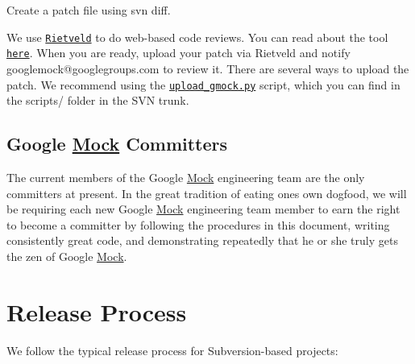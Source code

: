 \begin{DoxyEnumerate}
\item Create a patch file using {\ttfamily svn diff}.
\end{DoxyEnumerate}
\begin{DoxyEnumerate}
\item We use \href{http://codereview.appspot.com/}{\tt Rietveld} to do web-\/based code reviews. You can read about the tool \href{https://github.com/rietveld-codereview/rietveld/wiki}{\tt here}. When you are ready, upload your patch via Rietveld and notify {\ttfamily googlemock@googlegroups.\+com} to review it. There are several ways to upload the patch. We recommend using the \href{../scripts/upload_gmock.py}{\tt upload\+\_\+gmock.\+py} script, which you can find in the {\ttfamily scripts/} folder in the S\+VN trunk.
\end{DoxyEnumerate}

\subsection*{Google \hyperlink{class_mock}{Mock} Committers}

The current members of the Google \hyperlink{class_mock}{Mock} engineering team are the only committers at present. In the great tradition of eating one\textquotesingle{}s own dogfood, we will be requiring each new Google \hyperlink{class_mock}{Mock} engineering team member to earn the right to become a committer by following the procedures in this document, writing consistently great code, and demonstrating repeatedly that he or she truly gets the zen of Google \hyperlink{class_mock}{Mock}.

\section*{Release Process}

We follow the typical release process for Subversion-\/based projects\+:


